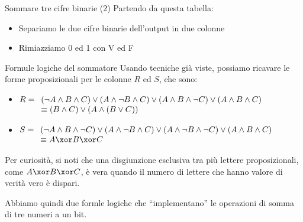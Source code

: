 \documentclass[aspectratio=169,10pt,dvipsnames,xcolor=table,handout]{beamer}
\begin{document}
\begin{frame}{Sommare tre cifre binarie (2)}
    \medskip
    Partendo da questa tabella:
    \begin{itemize}
        \item<2-> Separiamo le due cifre binarie dell'output in due colonne
        \item<4-> Rimiazziamo 0 ed 1 con V ed F
    \end{itemize}
\end{frame}

\begin{frame}{Formule logiche del sommatore}
    Usando tecniche già viste, possiamo ricavare le forme proposizionali per le colonne $R$ ed $S$, che sono:
    \begin{itemize}
        \item $R = \begin{array}[t]{l}
            (\lnot A \land B \land C) \lor (A \land \lnot B \land C) \lor (A \land B \land \lnot C) \lor (A \land B \land C) \\
            \equiv (B \wedge C) \vee (A \wedge (B \vee C))
        \end{array}$
        \item $S = \begin{array}[t]{l}
            (\lnot A \land B \land \lnot C) \lor (A \land \lnot B \land C) \lor (A \land \lnot B \land \lnot C) \lor (A \land B \land C) \\
            \equiv A \xor B \xor C
        \end{array}$
    \end{itemize}

    \smallskip
    Per curiosità, si noti che una disgiunzione esclusiva tra più lettere proposizionali, come $A \xor B \xor C$, è vera quando il numero di lettere che hanno valore di verità vero è dispari.

    \medskip
    Abbiamo quindi due formle logiche che ``implementano''  le operazioni di somma di tre numeri a un bit.
\end{frame}
\end{document}
